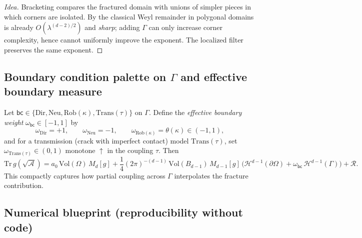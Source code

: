 \begin{proof}[Idea]
Bracketing compares the fractured domain with unions of simpler pieces in which corners are isolated.
By \cite{SafarovVassiliev1997} the classical Weyl remainder in polygonal domains is already
$O(\lambda^{(d-2)/2})$ and \emph{sharp}; adding $\Gamma$ can only increase corner complexity,
hence cannot uniformly improve the exponent. The localized filter preserves the same exponent.
\end{proof}

\subsection{Boundary condition palette on $\Gamma$ and effective boundary measure}
\label{sub:bc-palette}

Let $\mathsf{bc}\in\{\mathrm{Dir},\mathrm{Neu},\mathrm{Rob}(\kappa),\mathrm{Trans}(\tau)\}$ on $\Gamma$.
Define the \emph{effective boundary weight} $\omega_{\mathsf{bc}}\in[-1,1]$ by
\[
\omega_{\mathrm{Dir}}=+1,\qquad
\omega_{\mathrm{Neu}}=-1,\qquad
\omega_{\mathrm{Rob}(\kappa)}=\theta(\kappa)\in(-1,1),
\]
and for a transmission (crack with imperfect contact) model $\mathrm{Trans}(\tau)$, set
$\omega_{\mathrm{Trans}(\tau)}\in(0,1)$ monotone $\uparrow$ in the coupling $\tau$.
Then
\[
\mathrm{Tr}\,g(\sqrt{\mathcal{A}})
=a_0\,\mathrm{Vol}(\Omega)\,M_d[g]
+\frac{1}{4}(2\pi)^{-(d-1)}\,\mathrm{Vol}(B_{d-1})\,M_{d-1}[g]\,
\Big(\mathcal{H}^{d-1}(\partial\Omega)+\omega_{\mathsf{bc}}\,\mathcal{H}^{d-1}(\Gamma)\Big)
+ \mathcal{R}.
\]
This compactly captures how partial coupling across $\Gamma$ interpolates the fracture contribution.

\subsection{Numerical blueprint (reproducibility without code)}
\label{sub:numerical-blueprint}

